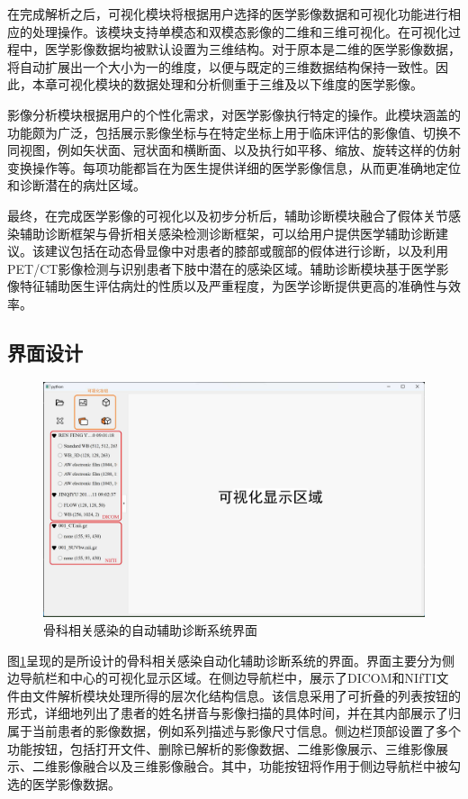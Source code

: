 在完成解析之后，可视化模块将根据用户选择的医学影像数据和可视化功能进行相应的处理操作。该模块支持单模态和双模态影像的二维和三维可视化。在可视化过程中，医学影像数据均被默认设置为三维结构。对于原本是二维的医学影像数据，将自动扩展出一个大小为一的维度，以便与既定的三维数据结构保持一致性。因此，本章可视化模块的数据处理和分析侧重于三维及以下维度的医学影像。

影像分析模块根据用户的个性化需求，对医学影像执行特定的操作。此模块涵盖的功能颇为广泛，包括展示影像坐标与在特定坐标上用于临床评估的影像值、切换不同视图，例如矢状面、冠状面和横断面、以及执行如平移、缩放、旋转这样的仿射变换操作等。每项功能都旨在为医生提供详细的医学影像信息，从而更准确地定位和诊断潜在的病灶区域。

最终，在完成医学影像的可视化以及初步分析后，辅助诊断模块融合了假体关节感染辅助诊断框架与骨折相关感染检测诊断框架，可以给用户提供医学辅助诊断建议。该建议包括在动态骨显像中对患者的膝部或髋部的假体进行诊断，以及利用PET/CT影像检测与识别患者下肢中潜在的感染区域。辅助诊断模块基于医学影像特征辅助医生评估病灶的性质以及严重程度，为医学诊断提供更高的准确性与效率。

\subsection{界面设计}

\begin{figure}[htbp]
  \centering
  \includegraphics[width=\textwidth]{figures/chap05_preview.jpg}
  \caption{骨科相关感染的自动辅助诊断系统界面}
  \label{fig:chap05_preview}
\end{figure}

图\ref{fig:chap05_preview}呈现的是所设计的骨科相关感染自动化辅助诊断系统的界面。界面主要分为侧边导航栏和中心的可视化显示区域。在侧边导航栏中，展示了DICOM和NIfTI文件由文件解析模块处理所得的层次化结构信息。该信息采用了可折叠的列表按钮的形式，详细地列出了患者的姓名拼音与影像扫描的具体时间，并在其内部展示了归属于当前患者的影像数据，例如系列描述与影像尺寸信息。侧边栏顶部设置了多个功能按钮，包括打开文件、删除已解析的影像数据、二维影像展示、三维影像展示、二维影像融合以及三维影像融合。其中，功能按钮将作用于侧边导航栏中被勾选的医学影像数据。

